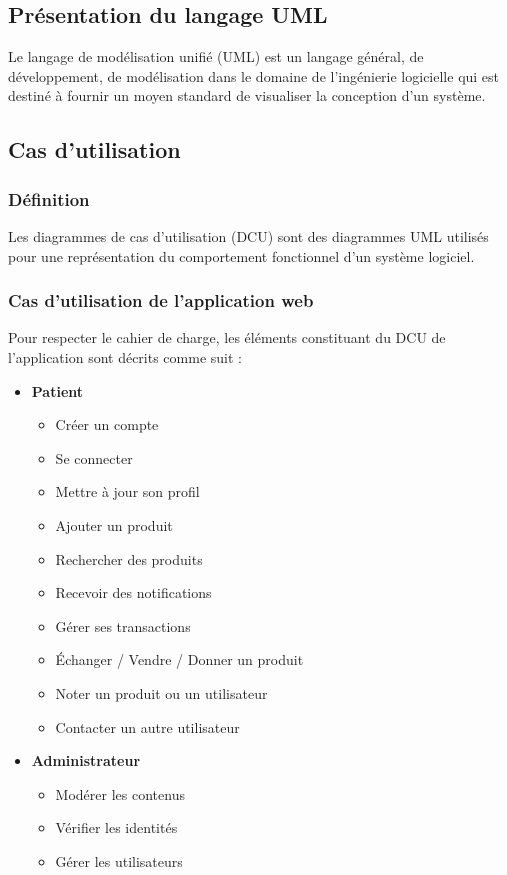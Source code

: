 \documentclass[12pt,a4paper]{report}
\begin{document}
	\subsection{Présentation du langage UML}
	Le langage de modélisation unifié (UML) est un langage général, de développement, de modélisation dans le domaine de l'ingénierie logicielle qui est destiné à fournir un moyen standard de visualiser la conception d'un système.
	
	\subsection{Cas d'utilisation}
	\subsubsection{Définition}
	Les diagrammes de cas d'utilisation (DCU) sont des diagrammes UML utilisés pour une représentation du comportement fonctionnel d'un système logiciel.
	
	\subsubsection{Cas d'utilisation de l'application web}
	Pour respecter le cahier de charge, les éléments constituant du DCU de l'application sont décrits comme suit :
	
	\begin{itemize}
		\item \textbf{Patient}
		\begin{itemize}
			\item Créer un compte
			\item Se connecter
			\item Mettre à jour son profil
			\item Ajouter un produit
			\item Rechercher des produits
			\item Recevoir des notifications
			\item Gérer ses transactions
			\item Échanger / Vendre / Donner un produit
			\item Noter un produit ou un utilisateur
			\item Contacter un autre utilisateur
		\end{itemize}
		\item \textbf{Administrateur}
		\begin{itemize}
			\item Modérer les contenus
			\item Vérifier les identités
			\item Gérer les utilisateurs
		\end{itemize}
	\end{itemize}
	
\end{document}
